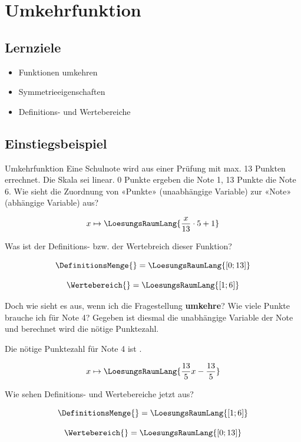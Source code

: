 \section{Umkehrfunktion}

\subsection{Lernziele}

\begin{itemize}
\item Funktionen umkehren
\item Symmetrieeigenschaften
\item Definitions- und Wertebereiche
\end{itemize} 
\newpage

\subsection{Einstiegsbeispiel}
\begin{beispiel}{Umkehrfunktion}{}
  Eine Schulnote wird aus einer Prüfung mit max. 13 Punkten errechnet.
  Die Skala sei linear. 0 Punkte ergeben die Note 1, 13 Punkte die
  Note 6. Wie sieht die Zuordnung von «Punkte» (unaabhängige Variable)
  zur «Note» (abhängige Variable) aus?

  \leserluft
  
  $$x \mapsto  \LoesungsRaumLang{\frac{x}{13}\cdot{} 5 + 1}$$

  Was ist der Definitions- bzw. der Wertebreich dieser Funktion?

  \leserluft
  
  $$\DefinitionsMenge{} = \LoesungsRaumLang{[0; 13]}$$

  \leserluft
  
  $$\Wertebereich{} = \LoesungsRaumLang{[1; 6]}$$

  Doch wie sieht es aus, wenn ich die Fragestellung \textbf{umkehre}?
  Wie viele Punkte brauche ich für Note 4? Gegeben ist diesmal die
  unabhängige Variable der Note und berechnet wird die nötige
  Punktezahl.

  \leserluft{}
  
  Die nötige Punktezahl für Note 4 ist .

  \leserluft{}

  
  $$x \mapsto \LoesungsRaumLang{\frac{13}5 x - \frac{13}5}$$

    Wie sehen Definitions- und Wertebereiche jetzt aus?

    $$\DefinitionsMenge{} = \LoesungsRaumLang{ [1; 6] }$$


    $$\Wertebereich{} = \LoesungsRaumLang{ [0;13] }$$
  
\end{beispiel}
\newpage

